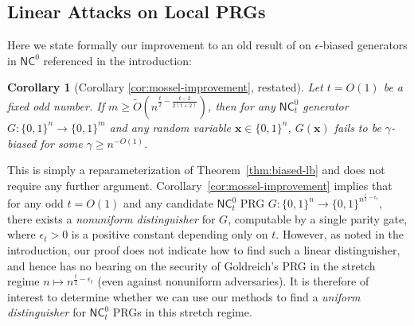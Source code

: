 \documentclass[11pt]{article}
\newtheorem*{corollary*}{Corollary}
\newcommand{\B}{\{0,1\}}
\begin{document}
\subsection{Linear Attacks on Local PRGs}
Here we state formally our improvement to an old result of \cite{mossel-epsilon} on $\epsilon$-biased generators in $\mathsf{NC}^0$ referenced in the introduction:
\begin{corollary*}[Corollary \ref{cor:mossel-improvement}, restated]
Let $t = O(1)$ be a fixed odd number. If $m \geq \tilde{O}( n^{\frac{t}{2} - \frac{t-2}{2(t+2)}})$, then for any $\mathsf{NC}^0_t$ generator $G: \B^n \to \B^m$ and any random variable $\bm{x} \in \B^n$, $G(\bm{x})$ fails to be $\gamma$-biased for some $\gamma \geq n^{-O(1)}$.
\end{corollary*}
This is simply a reparameterization of Theorem~\ref{thm:biased-lb} and does not require any further argument. Corollary~\ref{cor:mossel-improvement} implies that for any odd $t=O(1)$ and any candidate $\mathsf{NC}_t^0$ PRG $G: \B^n \to \B^{n^{\frac{t}{2}- \epsilon_t}}$, there exists a \emph{nonuniform distinguisher} for $G$, computable by a single parity gate, where $\epsilon_t > 0$ is a positive constant depending only on $t$. However, as noted in the introduction, our proof does not indicate how to find such a linear distinguisher, and hence has no bearing on the security of Goldreich's PRG in the stretch regime $n \mapsto n^{\frac{t}{2}- \epsilon_t}$ (even against nonuniform adversaries). It is therefore of interest to determine whether we can use our methods to find a \emph{uniform distinguisher} for $\mathsf{NC}^0_t$ PRGs in this stretch regime. 
\end{document}
